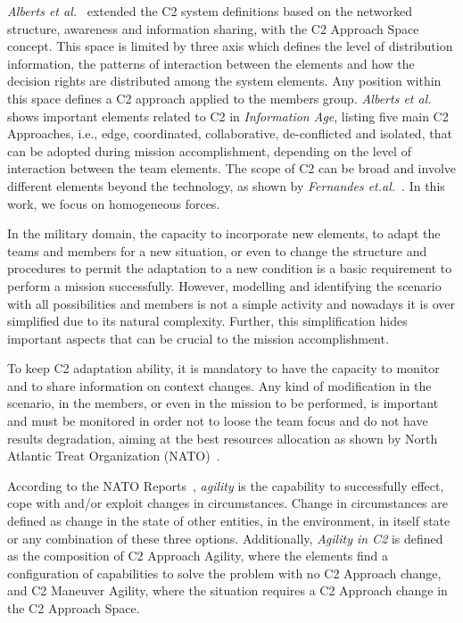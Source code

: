 \textit{Alberts et al.}~\cite{Alberts2000} extended the C2 system definitions based on the networked structure, awareness and information sharing, with the C2 Approach Space concept. This space is limited by three axis which defines the level of distribution information, the patterns of interaction between the elements and how the decision rights are distributed among the system elements. Any position within this space defines a C2 approach applied to the members group. \textit{Alberts et al.}~\cite{Power01} shows important elements related to C2 in \textit{Information Age}, listing five main C2 Approaches, i.e., edge, coordinated, collaborative, de-conflicted and isolated, that can be adopted during mission accomplishment, depending on the level of interaction between the team elements.
The scope of C2 can be broad and involve different elements beyond the technology, as shown by \textit{Fernandes et.al.}~\cite{Fernandes2016}. In this work, we focus on homogeneous forces. 

In the military domain, the capacity to incorporate new elements, to adapt the teams and members for a new situation, or even to change the structure and procedures to permit the adaptation to a new condition is a basic requirement to perform a mission successfully. However, modelling and identifying the scenario with all possibilities and members is not a simple activity and nowadays it is over simplified due to its natural complexity. Further, this simplification hides important aspects that can be crucial to the mission accomplishment.

To keep C2 adaptation ability, it is mandatory to have the capacity to monitor and to share information on  context changes. Any kind of modification in the scenario, in the members, or even in the mission to be performed, is important and must be monitored in order not to loose the team focus and do not have results degradation, aiming at the best resources allocation as shown by North Atlantic Treat 
Organization (NATO)~\cite{FRANCE2014}. 

According to the NATO Reports~\cite{FRANCE2014}, \textit{agility} is the capability to successfully effect, cope with and/or exploit changes in circumstances. Change in circumstances are defined as change in the state of other entities, in the environment, in  itself state or any combination of these three options. Additionally, \textit{Agility in C2} is defined as the composition of C2 Approach Agility, where the elements find a configuration of capabilities to solve the problem with no C2 Approach change, and C2 Maneuver Agility, where the situation requires a C2 Approach change in the C2 Approach Space.

